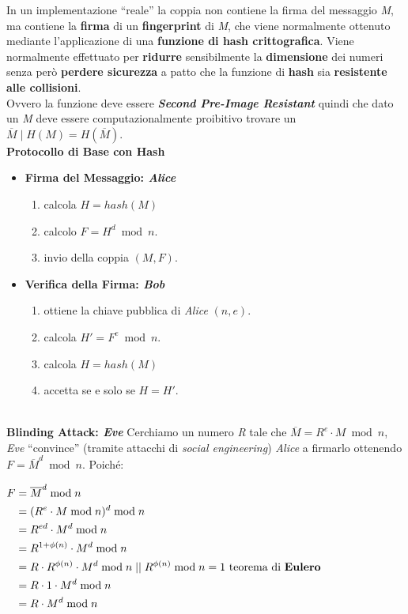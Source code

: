 In un implementazione ``reale'' la coppia non contiene la firma del messaggio \textit{M}, ma contiene la \textbf{firma} di un \textbf{fingerprint} di \textit{M}, che viene normalmente ottenuto mediante l'applicazione di una \textbf{funzione di hash crittografica}. Viene normalmente effettuato per \textbf{ridurre} sensibilmente la \textbf{dimensione} dei numeri senza però \textbf{perdere sicurezza} a patto che la funzione di \textbf{hash} sia \textbf{resistente alle collisioni}. \\
Ovvero la funzione deve essere \textbf{\textit{Second Pre-Image Resistant}} quindi che dato un \textit{M} deve essere computazionalmente proibitivo trovare un $\overline{M}\;|\;H(M) = H(\overline{M})$.
\\ \newline
\textbf{Protocollo di Base con Hash}
\begin{itemize}
    \item \textbf{Firma del Messaggio: \textit{Alice}}
    \begin{enumerate}
        \item calcola $H = hash(M)$
        \item calcolo $F = H^d \bmod n$.
        \item invio della coppia $(M, F)$.
    \end{enumerate}
    \item \textbf{Verifica della Firma: \textit{Bob}}
    \begin{enumerate}
        \item ottiene la chiave pubblica di \textit{Alice} $(n, e)$.
        \item calcola $H' = F^e \bmod n$.
        \item calcola $H = hash(M)$
        \item accetta se e solo se $H = H'$.
    \end{enumerate}
\end{itemize}
\   \\
\textbf{Blinding Attack: \textit{Eve}}
Cerchiamo un numero \textit{R} tale che $\overline{M} = R^e \cdot M \bmod n$, \textit{Eve} ``convince'' (tramite attacchi di \textit{social engineering}) \textit{Alice} a firmarlo ottenendo $F = \overline{M}^d \bmod n$. Poiché:
\begin{center}
    \begin{math}
        \begin{aligned}
            F &= \overline{M}^d \bmod n \\
            &= (R^e \cdot M \bmod n)^d \bmod n \\
            &= R^{ed} \cdot M^d \bmod n \\
            &= R^{1 + \phi(n)} \cdot M^{d} \bmod n \\
            &= R \cdot R^{\phi(n)} \cdot M^d \bmod n \; || \; R^{\phi(n)} \bmod n = 1 \text{ teorema di \textbf{Eulero}} \\ 
            &= R \cdot 1 \cdot M^d \bmod n \\
            &= R \cdot M^d \bmod n
        \end{aligned}
    \end{math}
\end{center}
